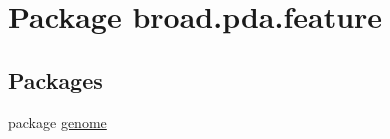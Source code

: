 \hypertarget{namespacebroad_1_1pda_1_1feature}{\section{Package broad.\+pda.\+feature}
\label{namespacebroad_1_1pda_1_1feature}
}
\subsection*{Packages}
\begin{DoxyCompactItemize}
\item 
package \hyperlink{namespacebroad_1_1pda_1_1feature_1_1genome}{genome}
\end{DoxyCompactItemize}
